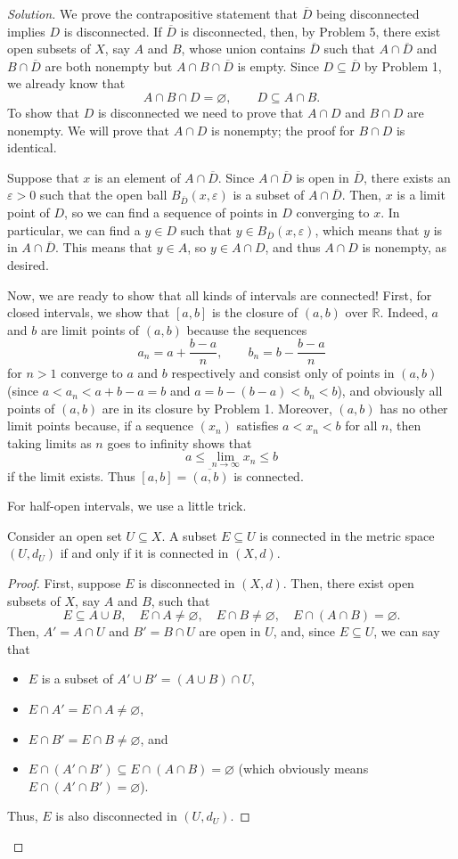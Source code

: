 \documentclass[11pt]{scrartcl}
\providecommand{\ol}{\overline}
\providecommand{\eps}{\varepsilon}
\providecommand{\RR}{\mathbb R}
\providecommand{\ii}{\item}
\newenvironment{soln}{\begin{proof}[Solution]}{\end{proof}}
\begin{document}
\begin{soln}
	We prove the contrapositive statement that
	$\ol D$ being disconnected implies $D$ is disconnected.
	If $\ol D$ is disconnected, then, by Problem 5, there exist
	open subsets of $X$, say $A$ and $B$, whose union contains $\ol D$
	such that $A\cap\ol D$ and $B\cap\ol D$ are both nonempty
	but $A\cap B\cap\ol D$ is empty.
	Since $D\subseteq \ol D$ by Problem 1, we already know that
	\[A\cap B\cap D = \varnothing,\qquad D\subseteq A\cap B.\]
	To show that $D$ is disconnected we need to prove that
	$A\cap D$ and $B\cap D$ are nonempty.
	We will prove that $A\cap D$ is nonempty;
	the proof for $B\cap D$ is identical.
	
	Suppose that $x$ is an element of $A\cap\ol D$.
	Since $A\cap\ol D$ is open in $\ol D$,
	there exists an $\eps > 0$ such that the open ball $B_{\ol D}(x, \eps)$
	is a subset of $A\cap\ol D$. Then, $x$ is a limit point of $D$,
	so we can find a sequence of points in $D$ converging to $x$.
	In particular, we can find a $y\in D$ such that $y\in B_{\ol D}(x,\eps)$,
	which means that $y$ is in $A\cap\ol D$. This means that $y\in A$,
	so $y\in A\cap D$, and thus $A\cap D$ is nonempty, as desired.
	
	Now, we are ready to show that all kinds of intervals are connected!
	First, for closed intervals, we show that $[a, b]$ is the closure of
	$(a, b)$ over $\RR$. Indeed, $a$ and $b$ are limit points of $(a, b)$
	because the sequences
	\[a_n = a + \frac{b-a}n,\qquad b_n = b - \frac {b-a}n\]
	for $n > 1$ converge to $a$ and $b$ respectively
	and consist only of points in $(a, b)$
	(since $a < a_n < a + b - a = b$ and $a = b - (b - a) < b_n < b$),
	and obviously all points of $(a, b)$ are in its closure by Problem 1.
	Moreover, $(a, b)$ has no other limit points because,
	if a sequence $(x_n)$ satisfies $a < x_n < b$ for all $n$, then
	taking limits as $n$ goes to infinity shows that
	\[a \le \lim_{n\to\infty}x_n \le b\]
	if the limit exists. Thus $[a, b] = \ol{(a, b)}$ is connected.
	
	For half-open intervals, we use a little trick.
	\begin{lemma}
		Consider an open set $U\subseteq X$.
		A subset $E\subseteq U$ is connected in the metric space $(U, d_U)$
		if and only if it is connected in $(X, d)$.
	\end{lemma}
	\begin{proof}
		First, suppose $E$ is disconnected in $(X, d)$.
		Then, there exist open subsets of $X$, say $A$ and $B$, such that
		\[E\subseteq A\cup B,\quad
		E\cap A\ne\varnothing, \quad E\cap B\ne\varnothing,\quad
		E\cap(A\cap B)=\varnothing.\]
		Then, $A' = A\cap U$ and $B' = B\cap U$ are open in $U$,
		and, since $E\subseteq U$, we can say that
		\begin{itemize}
			\ii $E$ is a subset of $A'\cup B' = (A\cup B)\cap U$,
			\ii $E\cap A' = E\cap A\ne \varnothing$,
			\ii $E\cap B' = E\cap B\ne\varnothing$, and
			\ii $E\cap(A'\cap B')\subseteq E\cap(A\cap B) = \varnothing$
			(which obviously means $E\cap(A'\cap B')=\varnothing$).
		\end{itemize}
		Thus, $E$ is also disconnected in $(U, d_U)$.
		

\end{proof}
\end{soln}
\end{document}
